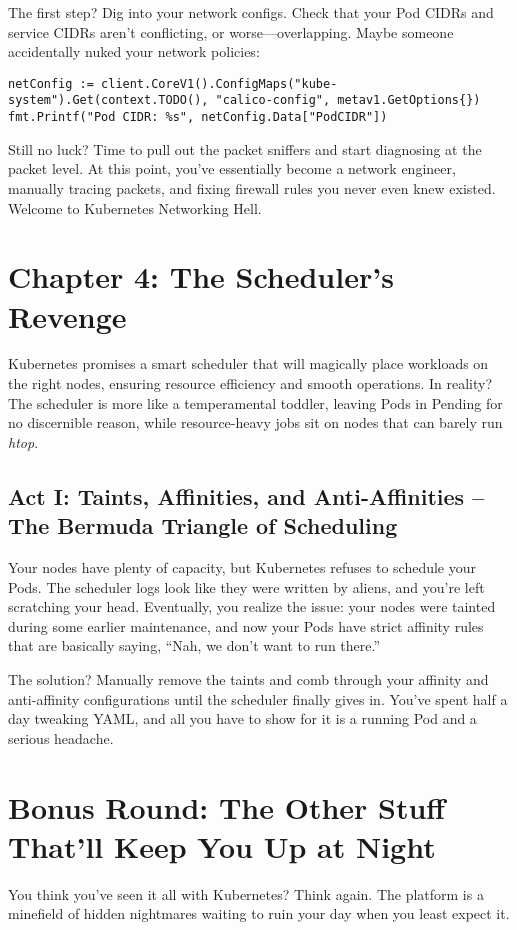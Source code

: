 The first step? Dig into your network configs. Check that your Pod CIDRs and service CIDRs aren’t conflicting, or worse—overlapping. Maybe someone accidentally nuked your network policies:

\begin{lstlisting}
netConfig := client.CoreV1().ConfigMaps("kube-system").Get(context.TODO(), "calico-config", metav1.GetOptions{})
fmt.Printf("Pod CIDR: %s", netConfig.Data["PodCIDR"])
\end{lstlisting}

Still no luck? Time to pull out the packet sniffers and start diagnosing at the packet level. At this point, you’ve essentially become a network engineer, manually tracing packets, and fixing firewall rules you never even knew existed. Welcome to Kubernetes Networking Hell.

\section{Chapter 4: The Scheduler’s Revenge}

Kubernetes promises a smart scheduler that will magically place workloads on the right nodes, ensuring resource efficiency and smooth operations. In reality? The scheduler is more like a temperamental toddler, leaving Pods in Pending for no discernible reason, while resource-heavy jobs sit on nodes that can barely run \textit{htop}.

\subsection{Act I: Taints, Affinities, and Anti-Affinities – The Bermuda Triangle of Scheduling}

Your nodes have plenty of capacity, but Kubernetes refuses to schedule your Pods. The scheduler logs look like they were written by aliens, and you’re left scratching your head. Eventually, you realize the issue: your nodes were tainted during some earlier maintenance, and now your Pods have strict affinity rules that are basically saying, “Nah, we don’t want to run there.”

The solution? Manually remove the taints and comb through your affinity and anti-affinity configurations until the scheduler finally gives in. You’ve spent half a day tweaking YAML, and all you have to show for it is a running Pod and a serious headache.

\section{Bonus Round: The Other Stuff That’ll Keep You Up at Night}

You think you’ve seen it all with Kubernetes? Think again. The platform is a minefield of hidden nightmares waiting to ruin your day when you least expect it.


